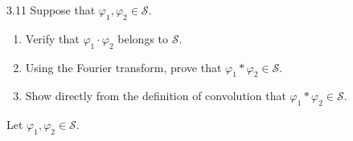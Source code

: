 \documentclass{article}
\begin{document}
\begin{prb}{3.11}
	Suppose that $\varphi_{1}, \varphi_{2} \in \mathcal{S}$. \vspace{-0.25cm} 
	\begin{enumerate}[itemsep =-2pt,label = (\alph{*})]
		\item Verify that $\varphi_{1} \cdot \varphi_{2}$ belongs to $\mathcal{S}$. 
		\item Using the Fourier transform, prove that $\varphi_{1} \ast \varphi_{2} \in \mathcal{S}$. 
		\item Show directly from the definition of convolution that $\varphi_{1} \ast \varphi_{2}\in \mathcal{S}$. 
	\end{enumerate}
\end{prb} 
Let $\varphi_{1}, \varphi_{2} \in \mathcal{S}$. \vspace{-0.25cm} 
\end{document}
